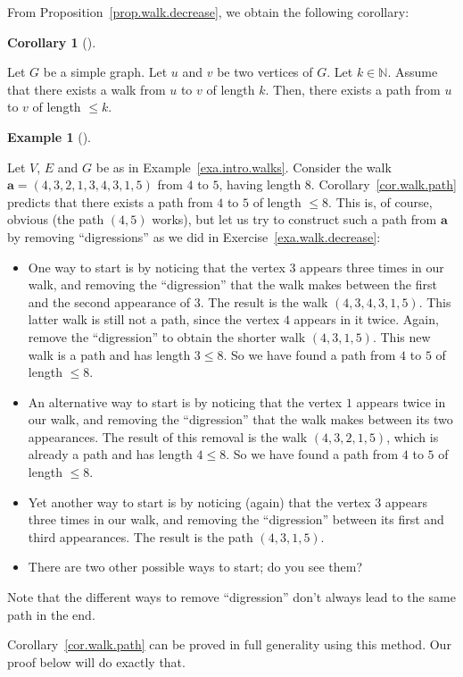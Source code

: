 \documentclass[numbers=enddot,12pt,final,onecolumn,notitlepage]{scrartcl}%
\theoremstyle{definition}
\newtheorem{coro}[theo]{Corollary}
\newenvironment{corollary}[1][]
{\begin{coro}[#1]\begin{leftbar}}
{\end{leftbar}\end{coro}}
\newtheorem{exam}[theo]{Example}
\newenvironment{example}[1][]
{\begin{exam}[#1]\begin{leftbar}}
{\end{leftbar}\end{exam}}
\newcommand{\NN}{\mathbb{N}}
\newcommand{\tup}[1]{\left( #1 \right)}
\begin{document}
From Proposition~\ref{prop.walk.decrease}, we obtain the following
corollary:

\begin{corollary} \label{cor.walk.path}
Let $G$ be a simple graph. Let $u$ and $v$ be two vertices of $G$.
Let $k \in \NN$.
Assume that there exists a walk from $u$ to $v$ of length $k$.
Then, there exists a path from $u$ to $v$ of length $\leq k$.
\end{corollary}

\begin{example} \label{exa.walk.path}
Let $V$, $E$ and $G$ be as in Example~\ref{exa.intro.walks}. Consider
the walk $\mathbf{a} = \tup{4, 3, 2, 1, 3, 4, 3, 1, 5}$ from $4$ to
$5$, having length $8$. Corollary~\ref{cor.walk.path} predicts that
there exists a path from $4$ to $5$ of length $\leq 8$. This is, of
course, obvious (the path $\tup{4, 5}$ works), but let us try to
construct such a path from $\mathbf{a}$ by removing ``digressions''
as we did in Exercise~\ref{exa.walk.decrease}:

\begin{itemize}
\item One way to start is by noticing that the vertex $3$ appears
  three times in our walk, and removing the ``digression'' that the
  walk makes between the first and the second appearance of $3$. The
  result is the walk $\tup{4, 3, 4, 3, 1, 5}$. This latter walk is
  still not a path, since the vertex $4$ appears in it twice. Again,
  remove the ``digression'' to obtain the shorter walk
  $\tup{4, 3, 1, 5}$. This new walk is a path and has length
  $3 \leq 8$. So we have found a path from $4$ to $5$ of length
  $\leq 8$.
\item An alternative way to start is by noticing that the vertex $1$
  appears twice in our walk, and removing the ``digression'' that the
  walk makes between its two appearances. The result of this removal
  is the walk $\tup{4, 3, 2, 1, 5}$, which is already a path and has
  length $4 \leq 8$. So we have found a path from $4$ to $5$ of length
  $\leq 8$.
\item Yet another way to start is by noticing (again) that the vertex
  $3$ appears three times in our walk, and removing the ``digression''
  between its first and third appearances. The result is the path
  $\tup{4, 3, 1, 5}$.
\item There are two other possible ways to start; do you see them?
\end{itemize}

Note that the different ways to remove ``digression'' don't always
lead to the same path in the end.

Corollary~\ref{cor.walk.path} can be proved in full generality using
this method. Our proof below will do exactly that.
\end{example}
\end{document}
